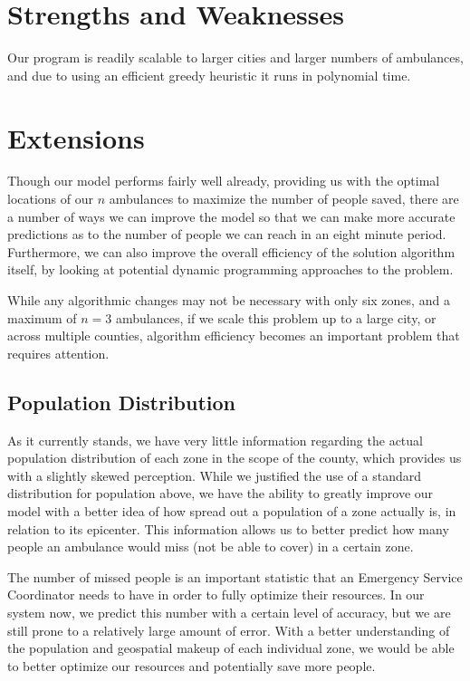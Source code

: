 \documentclass[notitlepage, 12pt]{article}
\begin{document}
\section{Strengths and Weaknesses}
Our program is readily scalable to larger cities and larger numbers of ambulances, and due to using an
efficient greedy heuristic it runs in polynomial time.

\section{Extensions}
Though our model performs fairly well already, providing us with the optimal locations of our $n$ ambulances to
maximize the number of people saved, there are a number of ways we can improve the model so that we can make more
accurate predictions as to the number of people we can reach in an eight minute period. Furthermore, we can also
improve the overall efficiency of the solution algorithm itself, by looking at potential dynamic programming approaches to the problem.

While any algorithmic changes may not be necessary with only six zones, and a maximum of $n = 3$ ambulances, if
we scale this problem up to a large city, or across multiple counties, algorithm efficiency becomes an important problem that requires attention.

\subsection{Population Distribution}
As it currently stands, we have very little information regarding the actual population distribution of each
zone in the scope of the county, which provides us with a slightly skewed perception. While we justified the
use of a standard distribution for population above, we have the ability to greatly improve our model with a
better idea of how spread out a population of a zone actually is, in relation to its epicenter. This information
allows us to better predict how many people an ambulance would miss (not be able to cover) in a certain zone.

The number of missed people is an important statistic that an Emergency Service Coordinator needs to have in
order to fully optimize their resources. In our system now, we predict this number with a certain level of accuracy,
but we are still prone to a relatively large amount of error. With a better understanding of the population and
geospatial makeup of each individual zone, we would be able to better optimize our resources and potentially save more people.
\end{document}
